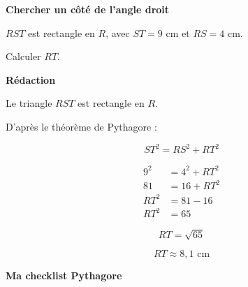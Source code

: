\documentclass[12pt,a4paper]{article}
\newcommand{\minititre}[1]{%
{\sffamily\large\bfseries\color{SavoirC}#1}\par
\vspace{0.12em}
}
\begin{document}
\begin{minipage}[t]{0.485\textwidth}
\vspace{0pt}

\begin{tcolorbox}[
  enhanced,
  colback=white,
  colframe=ActionC!55,
  boxrule=0.6pt,
  arc=2mm,
  left=3mm,
  right=3mm,
  top=1.5mm,
  bottom=1.5mm
]

{\sffamily\bfseries\color{ActionC}
Chercher un côté de l'angle droit}

\smallskip

\(RST\) est rectangle en \(R\), avec
\(ST=9\) cm et \(RS=4\) cm.

Calculer \(RT\).

\smallskip

\textbf{Rédaction}

\smallskip

Le triangle \(RST\) est rectangle en \(R\).

D'après le théorème de Pythagore :

\[
ST^2=RS^2+RT^2
\]

\[
\begin{aligned}
9^2 &= 4^2+RT^2\\
81 &= 16+RT^2\\
RT^2 &= 81-16\\
RT^2 &= 65
\end{aligned}
\]

\[
RT=\sqrt{65}
\]

\[
\boxed{RT\approx8{,}1\text{ cm}}
\]

\end{tcolorbox}

\end{minipage}

\vspace{0.3em}


\minititre{Ma checklist Pythagore}
\end{document}
